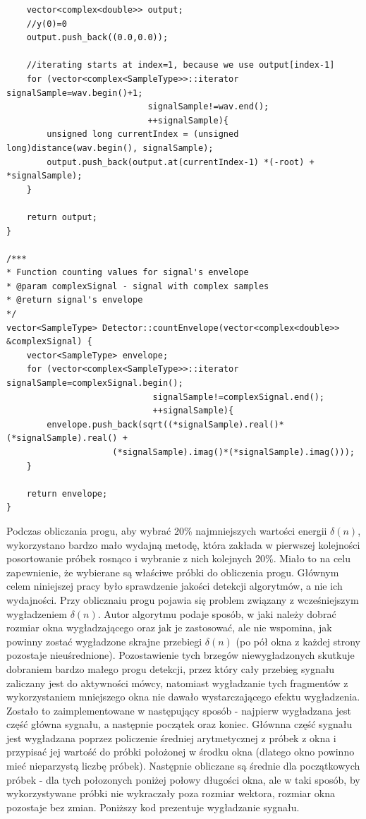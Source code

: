 \documentclass[eng,printmode]{mgr}
\begin{document}
\begin{lstlisting}
	vector<complex<double>> output;
	//y(0)=0
	output.push_back((0.0,0.0));
	
	//iterating starts at index=1, because we use output[index-1]
	for (vector<complex<SampleType>>::iterator signalSample=wav.begin()+1;
							signalSample!=wav.end();
							++signalSample){
		unsigned long currentIndex = (unsigned long)distance(wav.begin(), signalSample);
		output.push_back(output.at(currentIndex-1) *(-root) + *signalSample);
	}
	
	return output;
}

/***
* Function counting values for signal's envelope
* @param complexSignal - signal with complex samples
* @return signal's envelope
*/
vector<SampleType> Detector::countEnvelope(vector<complex<double>> &complexSignal) {
	vector<SampleType> envelope;
	for (vector<complex<SampleType>>::iterator signalSample=complexSignal.begin();
							 signalSample!=complexSignal.end(); 
							 ++signalSample){
		envelope.push_back(sqrt((*signalSample).real()*(*signalSample).real() +
					 (*signalSample).imag()*(*signalSample).imag()));
	}
	
	return envelope;
}

\end{lstlisting}\vspace{5mm}


Podczas obliczania progu, aby wybrać 20\% najmniejszych wartości energii $\delta(n)$, wykorzystano bardzo mało wydajną metodę, która zakłada w pierwszej kolejności posortowanie próbek rosnąco i wybranie z nich kolejnych 20\%. Miało to na celu zapewnienie, że wybierane są właściwe próbki do obliczenia progu. Głównym celem niniejszej pracy było  sprawdzenie jakości detekcji algorytmów, a nie ich wydajności. Przy oblicznaiu progu pojawia się problem związany z wcześniejszym wygładzeniem $\delta(n)$. Autor algorytmu podaje sposób, w jaki należy dobrać rozmiar okna wygładzającego oraz jak je zastosować, ale nie wspomina, jak powinny zostać wygładzone skrajne przebiegi $\delta(n)$ (po pół okna z każdej strony pozostaje nieuśrednione). Pozostawienie tych brzegów niewygładzonych skutkuje dobraniem bardzo małego progu detekcji, przez który cały przebieg sygnału zaliczany jest do aktywności mówcy, natomiast wygładzanie tych fragmentów z wykorzystaniem mniejszego okna nie dawało wystarczającego efektu wygładzenia. Zostało to zaimplementowane w następujący sposób - najpierw wygładzana jest część główna sygnału, a następnie początek oraz koniec. Głównna część sygnału jest wygładzana poprzez policzenie średniej arytmetycznej z próbek z okna i przypisać jej wartość do próbki położonej w środku okna (dlatego okno powinno mieć nieparzystą liczbę próbek). Następnie obliczane są średnie dla początkowych próbek - dla tych połozonych poniżej połowy długości okna, ale w taki sposób, by wykorzystywane próbki nie wykraczały poza rozmiar wektora, rozmiar okna pozostaje bez zmian. Poniższy kod prezentuje wygładzanie sygnału.
\end{document}
